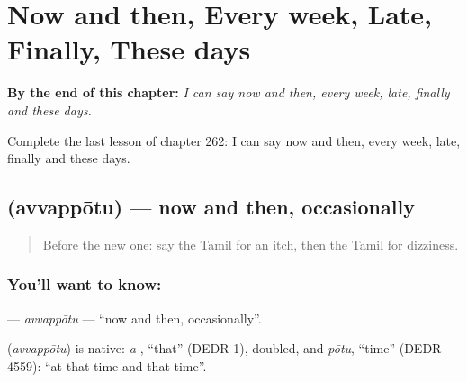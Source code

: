 
\chapter{Now and then, Every week, Late, Finally, These days}
\label{ch:ta-now-and-then-every-week-late-finally-these-days}

\begin{chapteropening}
\textbf{By the end of this chapter:} \emph{I can say now and then, every week, late, finally and these days.}

Complete the last lesson of chapter 262: I can say now and then, every week, late, finally and these days.
\end{chapteropening}

\section[\texorpdfstring{\ta{அவ்வப்போது} (avvappōtu)}{அவ்வப்போது (avvappōtu)}]{ (avvappōtu) — now and then, occasionally}

\label{lesson:TA-C262-avvappotu}



\begin{quote}
Before the new one: say the Tamil for an itch, then the Tamil for dizziness.
\end{quote}

\subsection*{You'll want to know: }
\textbf{} — \emph{avvappōtu} — \textquotedblleft{}now and then, occasionally\textquotedblright{}.

\begin{cousinweb}
\textbf{} (\emph{avvappōtu}) is native: \emph{a-}, \textquotedblleft{}that\textquotedblright{} (DEDR 1), doubled, and \emph{pōtu}, \textquotedblleft{}time\textquotedblright{} (DEDR 4559): \textquotedblleft{}at that time and that time\textquotedblright{}.
\end{cousinweb}

